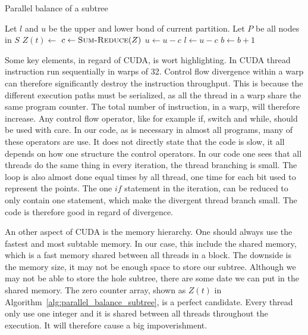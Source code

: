 \begin{algorithm}[h]
\caption{Parallel balance of a subtree}
\label{alg:parallel_balance_subtree}
\begin{algorithmic}
        \State Let $l$ and $u$ be the upper and lower bond of current partition.
        \State Let $P$ be all nodes in $S$
        \Repeat
                \State $Z(t) \gets $  
            \EndFor
            \State $c \gets \Call{Sum-Reduce}{Z}$ 
                \State$ u \gets u-c$
            \Else
                \State$l \gets u-c$
            \EndIf
            \State $b \gets b+1$ 
            \State {}
        \State {}
    \EndFunction
\end{algorithmic}
\end{algorithm}


Some key elements, in regard of CUDA\@, is wort highlighting. In CUDA thread instruction run sequentially in warps of 32. Control flow divergence within a warp can therefore significantly destroy the instruction throughput. This is because the different execution paths must be serialized, as all the thread in a warp share the same program counter\cite{cuda_c_best_practices_guide}. The total number of instruction, in a warp, will therefore increase. Any control flow operator, like for example if, switch and while, should be used with care. In our code, as is necessary in almost all programs, many of these operators are use. It does not directly state that the code is slow, it all depends on how one structure the control operators. In our code one sees that all threads do the same thing in every iteration, the thread branching is small. The loop is also almost done equal times by all thread, one time for each bit used to represent the points. The one $if$ statement in the iteration, can be reduced to only contain one statement, which make the divergent thread branch small. The code is therefore good in regard of divergence.

An other aspect of CUDA is the memory hierarchy. One should always use the fastest and most subtable memory. In our case, this include the shared memory, which is a fast memory shared between all threads in a block. The downside is the memory size, it may not be enough space to store our subtree. Although we may not be able to store the hole subtree, there are some date we can put in the shared memory. The zero counter array, shown as $Z(t)$ in Algorithm~\ref{alg:parallel_balance_subtree}, is a perfect candidate. Every thread only use one integer and it is shared between all threads throughout the execution. It will therefore cause a big impoverishment.






